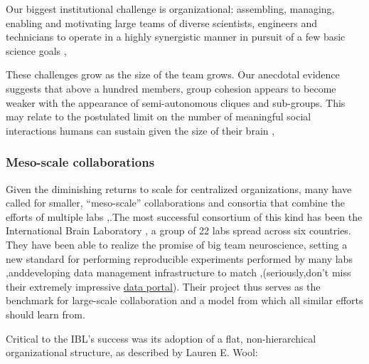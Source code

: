 \documentclass{article}
\begin{document}
\begin{leftbar}
Our biggest institutional challenge is organizational: assembling,
managing, enabling and motivating large teams of diverse scientists,
engineers and technicians to operate in a highly synergistic manner in
pursuit of a few basic science goals \cite{grillnerWorldwideInitiativesAdvance2016},\end{leftbar}
\begin{leftbar}
These challenges grow as the size of the team grows. Our anecdotal
evidence suggests that above a hundred members, group cohesion appears
to become weaker with the appearance of semi-autonomous cliques and
sub-groups. This may relate to the postulated limit on the number of
meaningful social interactions humans can sustain given the size of
their brain \cite{kochBigScienceTeam2016},\end{leftbar}
\hypertarget{meso-scale-collaborations}{%
\subsubsection{Meso-scale
collaborations}\label{meso-scale-collaborations}}

Given the diminishing returns to scale for centralized organizations,
many have called for smaller, ``meso-scale'' collaborations and
consortia that combine the efforts of multiple labs \cite{mainenBetterWayCrack2016},.The most successful consortium of this
kind has been the International Brain Laboratory \cite{
abbottInternationalLaboratorySystems2017, woolKnowledgeNetworksHow2020}, a group of 22 labs spread across six countries. They have been
able to realize the promise of big team neuroscience, setting a new
standard for performing reproducible experiments performed by many labs
\cite{laboratoryStandardizedReproducibleMeasurement2020},anddeveloping data management infrastructure to match \cite{laboratoryDataArchitectureLargescale2020},(seriously,don't miss
their extremely impressive
\href{https://data.internationalbrainlab.org/}{data portal}). Their
project thus serves as the benchmark for large-scale collaboration and a
model from which all similar efforts should learn from.

Critical to the IBL's success was its adoption of a flat,
non-hierarchical organizational structure, as described by Lauren E.
Wool:
\end{document}
